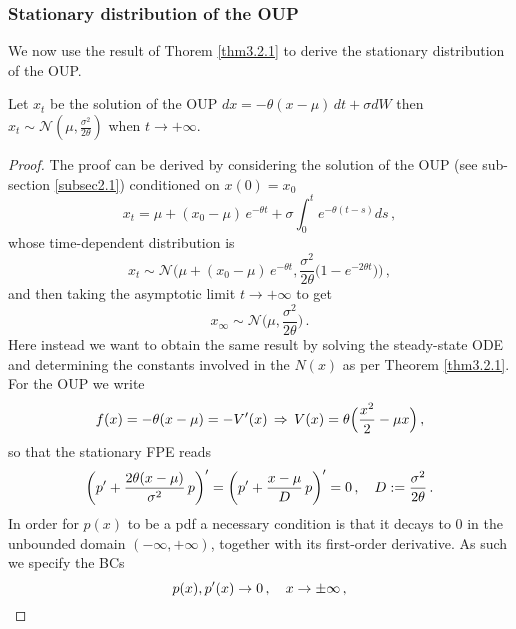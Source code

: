 \documentclass[../main.tex]{subfiles}
\begin{document}
\subsubsection{Stationary distribution of the OUP}\label{subsec3.2.0}
We now use the result of Thorem \ref{thm3.2.1} to derive the stationary distribution of the OUP.
\begin{theorem}[label=thm2.3.4.2]{}{}
     Let $x_{t}$ be the solution of the OUP $dx = -\theta(x-\mu)\,dt + \sigma dW$ then $x_{t}\sim \mathcal{N}(\mu,\frac{\sigma^{2}}{2\theta})$ when $t\to+\infty$.
\end{theorem}
\begin{proof}
The proof can be derived by considering the solution of the OUP (see sub-section \ref{subsec2.1}) conditioned on $x(0)=x_{0}$
\begin{equation*}
     x_{t} = \mu + (x_{0}-\mu)\,e^{-\theta t} + \sigma \int_{0}^{t}e^{-\theta(t-s)}ds\,,
\end{equation*}
whose time-dependent distribution is
\begin{equation*}
     x_{t}\sim \mathcal{N}\bigg(\mu + (x_{0}-\mu)\,e^{-\theta t}, \frac{\sigma^{2}}{2\theta}\Big(1-e^{-2\theta t}\Big)\bigg)\,,
\end{equation*}
and then taking the asymptotic limit $t\to+\infty$ to get
\begin{equation*}
     x_{\infty}\sim \mathcal{N}\bigg(\mu,\frac{\sigma^{2}}{2\theta}\bigg)\,.
\end{equation*}
Here instead we want to obtain the same result by solving the steady-state ODE and determining the constants involved in the $N(x)$ as per Theorem \ref{thm3.2.1}.
For the OUP we write 
\begin{equation*}
        f(x)=-\theta (x-\mu)=-V'(x)\,\Rightarrow\,V(x)=\theta\Big(\frac{x^{2}}{2} - \mu x\Big)\,,
\end{equation*}
so that the stationary FPE reads 
\begin{equation*}
        \bigg(p'+\frac{2\theta(x-\mu)}{\sigma^2}\,p\bigg)'=\bigg(p'+\frac{x-\mu}{D}\,p\bigg)'=0\,,\quad D:=\frac{\sigma^{2}}{2\theta}\,.
\end{equation*}
In order for $p(x)$ to be a pdf a necessary condition is that it decays to $0$ in the unbounded domain $(-\infty,+\infty)$, together with its first-order derivative.
As such we specify the BCs
\begin{equation*}
     p(x),p'(x)\to 0\,,\quad x\to\pm\infty\,,
\end{equation*}

\end{proof}
\end{document}
